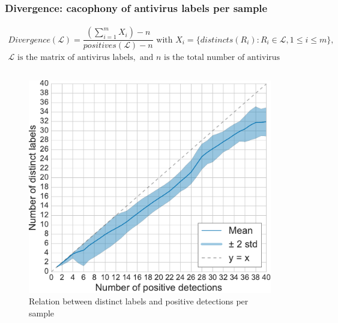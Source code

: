 \begin{frame}
    \frametitle{Divergence: cacophony of antivirus labels per sample}
    \vspace{-10pt}

    \scriptsize{
        \begin{gather*}
            Divergence(\mathcal{L}) = \dfrac{(\sum_{i=1}^m X_i) - n}{positives(\mathcal{L}) - n}
            \text{ with } X_i = \{distincts(R_i) : R_i \in \mathcal{L}, 1 \leq i \leq m\}, \\
            \mathcal{L} \text{ is the matrix of antivirus labels},
            \text{ and } n \text{ is the total number of antivirus}
        \end{gather*}
    }

    \vspace{-20pt}

    \begin{columns}
        \begin{column}{0.5\textwidth}
            \begin{figure}[!ht]
                \includegraphics[width=\textwidth]{figures/stase/divergence.pdf}
                \caption{\footnotesize{Relation between distinct labels and positive detections per sample}}
            \end{figure}
        \end{column}

        \begin{column}{0.55\textwidth}
            \vspace{-15pt}
            \centering
            \small{}


\end{column}
\end{columns}
\end{frame}
